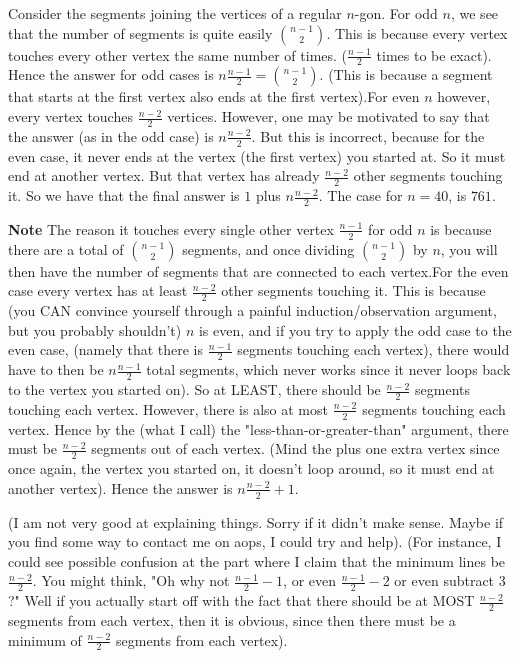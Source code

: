 \begin{enumerate}
Consider the segments joining the vertices of a regular $n$-gon. For odd $n$, we see that the number of segments is quite easily $\binom{n-1}{2}$. This is because every vertex touches every other vertex the same number of times. ($\frac{n-1}{2}$ times to be exact). Hence the answer for odd cases is $n\frac{n-1}{2}=\binom{n-1}{2}$. (This is because a segment that starts at the first vertex also ends at the first vertex).For even $n$ however, every vertex touches $\frac{n-2}{2}$ vertices. However, one may be motivated to say that the answer (as in the odd case) is $n\frac{n-2}{2}$. But this is incorrect, because for the even case, it never ends at the vertex (the first vertex) you started at. So it must end at another vertex. But that vertex has already $\frac{n-2}{2}$ other segments touching it. So we have that the final answer is $1$ plus $n\frac{n-2}{2}$. The case for $n=40$, is $761$.

 \textbf{Note} The reason it touches every single other vertex $\frac{n-1}{2}$ for odd $n$ is because there are a total of $\binom{n-1}{2}$ segments, and once dividing $\binom{n-1}{2}$ by $n$, you will then have the number of segments that are connected to each vertex.For the even case every vertex has at least $\frac{n-2}{2}$ other segments touching it. This is because (you CAN convince yourself through a painful induction/observation argument, but you probably shouldn't) $n$ is even, and if you try to apply the odd case to the even case, (namely that there is $\frac{n-1}{2}$ segments touching each vertex), there would have to then be $n\frac{n-1}{2}$ total segments, which never works since it never loops back to the vertex you started on). So at LEAST, there should be $\frac{n-2}{2}$ segments touching each vertex. However, there is also at most $\frac{n-2}{2}$ segments touching each vertex. Hence by the (what I call) the "less-than-or-greater-than" argument, there must be $\frac{n-2}{2}$ segments out of each vertex. (Mind the plus one extra vertex since once again, the vertex you started on, it doesn't loop around, so it must end at another vertex). Hence the answer is $n\frac{n-2}{2}+1$. 

 (I am not very good at explaining things. Sorry if it didn't make sense. Maybe if you find some way to contact me on aops, I could try and help). (For instance, I could see possible confusion at the part where I claim that the minimum lines be $\frac{n-2}{2}$. You might think, "Oh why not $\frac{n-1}{2}-1$, or even $\frac{n-1}{2}-2$ or even subtract $3$?" Well if you actually start off with the fact that there should be at MOST $\frac{n-2}{2}$ segments from each vertex, then it is obvious, since then there must be a minimum of $\frac{n-2}{2}$ segments from each vertex).


\end{enumerate}
